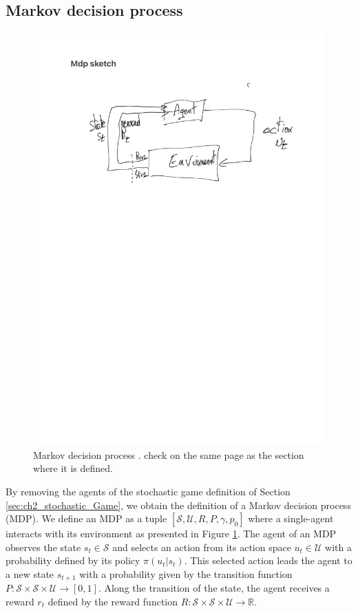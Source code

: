 \subsection{Markov decision process} \label{sec:ch2_mdp}
\begin{figure}
    \centering
    \includegraphics[width=\textwidth]{tex_thesis/figures/ch2/mdp_sketch.pdf}
    \caption{Markov decision process \citep{sutton2018reinforcement}. \todo check on the same page as the section where it is defined.}
    \label{fig:ch2_mdp}
\end{figure}

By removing the agents of the stochastic game definition of Section \ref{sec:ch2_stochastic_Game}, we obtain the definition of a Markov decision process (MDP).
We define an MDP as a tuple $[\mathcal{S}, \mathcal{U}, R, P, \gamma, p_0]$ where a single-agent interacts with its environment as presented in Figure \ref{fig:ch2_mdp}.
The agent of an MDP observes the state $s_t \in \mathcal{S}$ and selects an action from its action space $u_t \in \mathcal{U}$ with a probability defined by its policy $\pi(u_t|s_t)$.
This selected action leads the agent to a new state $s_{t+1}$ with a probability given by the transition function $P:\mathcal{S} \times \mathcal{S} \times \mathcal{U} \rightarrow [0,1]$.
Along the transition of the state, the agent receives a reward $r_t$ defined by the reward function $R:\mathcal{S} \times \mathcal{S} \times \mathcal{U} \rightarrow \mathbb{R}$.

